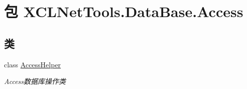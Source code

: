 \hypertarget{namespace_x_c_l_net_tools_1_1_data_base_1_1_access}{\section{包 X\-C\-L\-Net\-Tools.\-Data\-Base.\-Access}
\label{namespace_x_c_l_net_tools_1_1_data_base_1_1_access}
}
\subsection*{类}
\begin{DoxyCompactItemize}
\item 
class \hyperlink{class_x_c_l_net_tools_1_1_data_base_1_1_access_1_1_access_helper}{Access\-Helper}
\begin{DoxyCompactList}\small\item\em Access数据库操作类 \end{DoxyCompactList}\end{DoxyCompactItemize}
